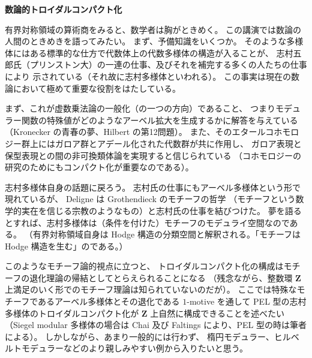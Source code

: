 \documentclass[uplatex,dvipdfmx]{jlreq}
\begin{document}
\noindent
{\large\bfseries 数論的トロイダルコンパクト化}

\medskip
\hspace*{\fill}{\large\bfseries 藤原 一宏（名大・多元数理）}

\bigskip\bigskip

有界対称領域の算術商をみると、数学者は胸がときめく。
この講演では数論の人間のときめきを語ってみたい。
まず、予備知識をいくつか。
そのような多様体にはある標準的な仕方で代数体上の代数多様体の構造が入ることが、
志村五郎氏（プリンストン大）の一連の仕事、及びそれを補完する多くの人たちの仕事により
示されている（それ故に志村多様体といわれる）。
この事実は現在の数論において極めて重要な役割をはたしている。

まず、これが虚数乗法論の一般化（の一つの方向）であること、
つまりモデュラー関数の特殊値がどのようなアーベル拡大を生成するかに解答を与えている
（Kronecker の青春の夢、Hilbert の第12問題）。
また、そのエタールコホモロジー群上にはガロア群とアデール化された代数群が共に作用し、
ガロア表現と保型表現との間の非可換類体論を実現すると信じられている
（コホモロジーの研究のためにもコンパクト化が重要なのである）。

\medskip

志村多様体自身の話題に戻ろう。
志村氏の仕事にもアーベル多様体という形で現れているが、
Deligne は Grothendieck のモチーフの哲学
（モチーフという数学的実在を信じる宗教のようなもの）と志村氏の仕事を結びつけた。
夢を語るとすれば、志村多様体は（条件を付けた）モチーフのモデュライ空間なのである。
（有界対称領域自身は Hodge 構造の分類空間と解釈される。「モチーフは Hodge 構造を生む」のである。）

このようなモチーフ論的視点に立つと、
トロイダルコンパクト化の構成はモチーフの退化理論の帰結としてとらえられることになる
（残念ながら、整数環 $\mathbf{Z}$ 上満足のいく形でのモチーフ理論は知られていないのだが）。
ここでは特殊なモチーフであるアーベル多様体とその退化である $1$-motive を通して
PEL 型の志村多様体のトロイダルコンパクト化が $\mathbf{Z}$ 上自然に構成できることを述べたい
（Siegel modular 多様体の場合は Chai 及び Faltings により、PEL 型の時は筆者による）。
しかしながら、あまり一般的には行わず、
楕円モデュラー、ヒルベルトモデュラーなどのより親しみやすい例から入りたいと思う。
\end{document}
